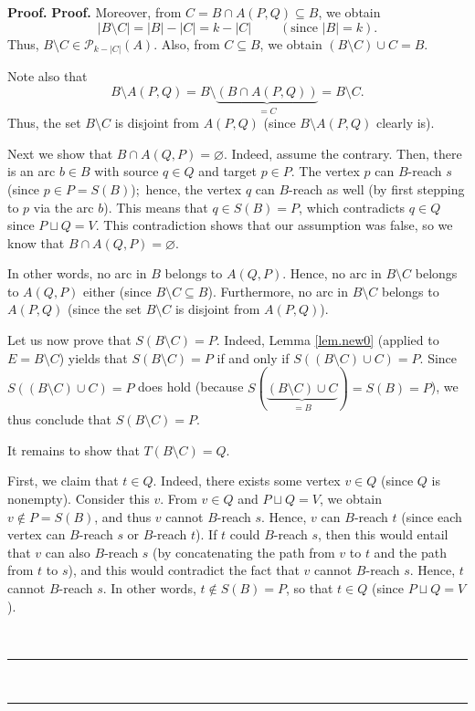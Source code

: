 \documentclass[numbers=enddot,12pt,final,onecolumn,notitlepage]{scrartcl}%
\theoremstyle{definition}
\newenvironment{proof}[1][Proof]{\noindent\textbf{#1.} }{\ \rule{0.5em}{0.5em}}
\theoremstyle{plainsl}
\begin{document}
\begin{proof}
\begin{proof}
Moreover, from $C=B\cap A\left(  P,Q\right)  \subseteq B$, we obtain
\[
\left\vert B\setminus C\right\vert =\left\vert B\right\vert -\left\vert
C\right\vert =k-\left\vert C\right\vert \ \ \ \ \ \ \ \ \ \ \left(
\text{since }\left\vert B\right\vert =k\right)  .
\]
Thus, $B\setminus C\in\mathcal{P}_{k-\left\vert C\right\vert }\left(
A\right)  $. Also, from $C\subseteq B$, we obtain $\left(  B\setminus
C\right)  \cup C=B$.

Note also that%
\[
B\setminus A\left(  P,Q\right)  =B\setminus\underbrace{\left(  B\cap
A(P,Q)\right)  }_{=C}=B\setminus C.
\]
Thus, the set $B\setminus C$ is disjoint from $A\left(  P,Q\right)  $ (since
$B\setminus A\left(  P,Q\right)  $ clearly is).

Next we show that $B\cap A\left(  Q,P\right)  =\varnothing$. Indeed, assume
the contrary. Then, there is an arc $b\in B$ with source $q\in Q$ and target
$p\in P$. The vertex $p$ can $B$-reach $s$ (since $p\in P=S\left(  B\right)
$);\ hence, the vertex $q$ can $B$-reach as well (by first stepping to $p$ via
the arc $b$). This means that $q\in S\left(  B\right)  =P$, which contradicts
$q\in Q$ since $P\sqcup Q=V$. This contradiction shows that our assumption was
false, so we know that $B\cap A\left(  Q,P\right)  =\varnothing$.

In other words, no arc in $B$ belongs to $A\left(  Q,P\right)  $. Hence, no
arc in $B\setminus C$ belongs to $A\left(  Q,P\right)  $ either (since
$B\setminus C\subseteq B$). Furthermore, no arc in $B\setminus C$ belongs to
$A\left(  P,Q\right)  $ (since the set $B\setminus C$ is disjoint from
$A\left(  P,Q\right)  $).

Let us now prove that $S\left(  B\setminus C\right)  =P$. Indeed, Lemma
\ref{lem.new0} (applied to $E=B\setminus C$) yields that $S\left(  B\setminus
C\right)  =P$ if and only if $S\left(  \left(  B\setminus C\right)  \cup
C\right)  =P$. Since $S\left(  \left(  B\setminus C\right)  \cup C\right)  =P$
does hold (because $S\left(  \underbrace{\left(  B\setminus C\right)  \cup
C}_{=B}\right)  =S\left(  B\right)  =P$), we thus conclude that $S\left(
B\setminus C\right)  =P$.

It remains to show that $T\left(  B\setminus C\right)  =Q$.

First, we claim that $t\in Q$. Indeed, there exists some vertex $v\in Q$
(since $Q$ is nonempty). Consider this $v$. From $v\in Q$ and $P\sqcup Q=V$,
we obtain $v\notin P=S\left(  B\right)  $, and thus $v$ cannot $B$-reach $s$.
Hence, $v$ can $B$-reach $t$ (since each vertex can $B$-reach $s$ or $B$-reach
$t$). If $t$ could $B$-reach $s$, then this would entail that $v$ can also
$B$-reach $s$ (by concatenating the path from $v$ to $t$ and the path from $t$
to $s$), and this would contradict the fact that $v$ cannot $B$-reach $s$.
Hence, $t$ cannot $B$-reach $s$. In other words, $t\notin S\left(  B\right)
=P$, so that $t\in Q$ (since $P\sqcup Q=V$).


\end{proof}
\end{proof}
\end{document}
